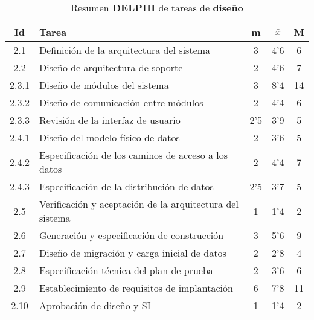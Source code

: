 \documentclass[11pt,a4paper,spanish,twoside]{report}
\begin{document}
\begin{table}[!h]
\centering
  \begin{tabular}{|c||p{8cm}||c|c|c|}
    \hline
    \textbf{Id} & \textbf{Tarea} & \textbf{m} & 
    \textbf{$\bar{x}$} &\textbf{M} \\
    \hline \hline
    2.1 & Definición de la arquitectura del sistema & 3 & 4'6 & 6 \\
    \hline
    2.2 & Diseño de arquitectura de soporte & 2 & 4'6 & 7 \\
    \hline
    2.3.1 & Diseño de módulos del sistema & 3 & 8'4 & 14 \\
    \hline
    2.3.2 & Diseño de comunicación entre módulos & 2 & 4'4 & 6 \\
    \hline
    2.3.3 & Revisión de la interfaz de usuario &2'5 & 3'9 & 5 \\
    \hline
    2.4.1 & Diseño del modelo físico de datos & 2 & 3'6 & 5 \\
    \hline
    2.4.2 & Especificación de los caminos de acceso a los datos & 2 & 4'4 & 7\\
    \hline
    2.4.3 & Especificación de la distribución de datos & 2'5 & 3'7 & 5 \\
    \hline
    2.5 & Verificación y aceptación de la arquitectura del sistema & 1 & 1'4
    & 2 \\
    \hline
    2.6 & Generación y especificación de construcción & 3 & 5'6 & 9 \\
    \hline
    2.7 & Diseño de migración y carga inicial de datos & 2 & 2'8 & 4 \\
    \hline
    2.8 & Especificación técnica del plan de prueba & 2 & 3'6 & 6 \\
    \hline
    2.9 & Establecimiento de requisitos de implantación & 6 & 7'8 & 11 \\
    \hline
    2.10 & Aprobación de diseño y SI & 1 & 1'4 & 2 \\
    \hline
  \end{tabular}
  \caption{Resumen \textbf{DELPHI} de tareas de \textbf{diseño}}
  \label{Tab:rDELPHIdis}
\end{table}
\end{document}
